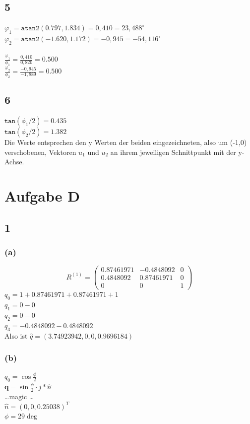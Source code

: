 \documentclass{../Vorlage/mat}
\begin{document}
\subsection*{5}
$ \varphi_1 = \mathtt{atan2}(0.797,1.834) = 0,410 = 23,488^\circ$\\
$ \varphi_2 = \mathtt{atan2}(-1.620,1.172) = -0,945 = -54,116^\circ$\\
\\
$ \frac{\varphi_1}{\phi_1} = \frac{0,410}{0,820} = 0.500$\\
$ \frac{\varphi_2}{\phi_2} = \frac{-0,945}{-1,889} = 0.500$

\subsection*{6}
$\mathtt{tan}(\phi_1/2) = 0.435$\\
$\mathtt{tan}(\phi_2/2) = 1.382$\\

Die Werte entsprechen den y Werten der beiden eingezeichneten, also um (-1,0) verschobenen, Vektoren $u_1$ und $u_2$ an ihrem jeweiligen Schnittpunkt mit der y-Achse.


\section*{Aufgabe D}
\subsection*{1}
\subsubsection*{(a)}
\begin{equation}
	R^{(1)} = \begin{pmatrix}
	0.87461971 & -0.4848092 & 0 \\
	0.4848092 & 0.87461971 & 0\\
	0&0&1
	\end{pmatrix}
\end{equation}
$q_0 = 1 + 0.87461971 + 0.87461971 + 1$\\
$q_1 = 0 - 0$\\
$q_2 = 0 - 0$\\
$q_3 = -0.4848092 - 0.4848092$\\
Also ist $\hat{q} = (3.74923942, 0, 0, 0.9696184)$
\subsubsection*{(b)}
$q_0 = \cos{\frac{\phi}{2}}$\\
$\mathbf{q} = \sin{\frac{\phi}{2}}\cdot j * \hat{n}$\\
\ldots magic \ldots\\
$\hat{n} = (0,0,0.25038)^T$\\
$\phi = 29\deg$
\end{document}
